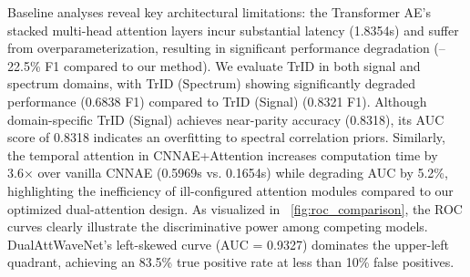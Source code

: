 \documentclass[conference]{IEEEtran}
\begin{document}
\begin{table}[htbp]
    \caption{Performance Comparison of DualAttWaveNet Against Baseline Models}
    \label{tab:main_results}
    \centering
\end{table}



Baseline analyses reveal key architectural limitations: the Transformer AE's stacked multi-head attention layers incur substantial latency (1.8354s) and suffer from overparameterization, resulting in significant performance degradation (–22.5\% F1 compared to our method). We evaluate TrID in both signal and spectrum domains, with TrID (Spectrum) showing significantly degraded performance (0.6838 F1) compared to TrID (Signal) (0.8321 F1). Although domain-specific TrID (Signal) achieves near-parity accuracy (0.8318), its AUC score of 0.8318 indicates an overfitting to spectral correlation priors. Similarly, the temporal attention in CNNAE+Attention increases computation time by 3.6× over vanilla CNNAE (0.5969s vs. 0.1654s) while degrading AUC by 5.2\%, highlighting the inefficiency of ill-configured attention modules compared to our optimized dual-attention design. As visualized in \figurename~\ref{fig:roc_comparison}, the ROC curves clearly illustrate the discriminative power among competing models. DualAttWaveNet's left-skewed curve (AUC = 0.9327) dominates the upper-left quadrant, achieving an 83.5\% true positive rate at less than 10\% false positives. 
\end{document}
